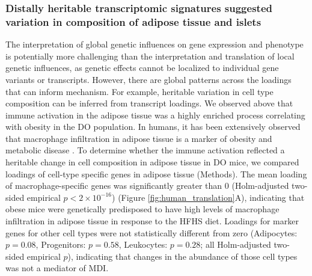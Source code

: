 \documentclass[
]{article}
\begin{document}
\subsubsection{Distally heritable transcriptomic signatures suggested
variation in composition of adipose tissue and
islets}\label{distally-heritable-transcriptomic-signatures-suggested-variation-in-composition-of-adipose-tissue-and-islets}

The interpretation of global genetic influences on gene expression and
phenotype is potentially more challenging than the interpretation and
translation of local genetic influences, as genetic effects cannot be
localized to individual gene variants or transcripts. However, there are
global patterns across the loadings that can inform mechanism. For
example, heritable variation in cell type composition can be inferred
from transcript loadings. We observed above that immune activation in
the adipose tissue was a highly enriched process correlating with
obesity in the DO population. In humans, it has been extensively
observed that macrophage infiltration in adipose tissue is a marker of
obesity and metabolic disease \cite{pmid24781408}. To determine whether
the immune activation reflected a heritable change in cell composition
in adipose tissue in DO mice, we compared loadings of cell-type specific
genes in adipose tissue (Methods). The mean loading of
macrophage-specific genes was significantly greater than 0
(Holm-adjusted two-sided empirical \(p < 2\times10^{-16}\)) (Figure
\ref{fig:human_translation}A), indicating that obese mice were
genetically predisposed to have high levels of macrophage infiltration
in adipose tissue in response to the HFHS diet. Loadings for marker
genes for other cell types were not statistically different from zero
(Adipocytes: \(p = 0.08\), Progenitors: \(p = 0.58\), Leukocytes:
\(p = 0.28\); all Holm-adjusted two-sided empirical \(p\)), indicating
that changes in the abundance of those cell types was not a mediator of
MDI.
\end{document}

